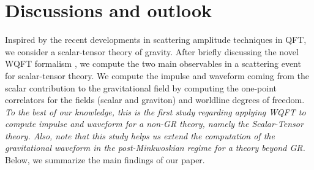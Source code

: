 \section{Discussions and outlook}\label{sec8}
Inspired by the recent developments in scattering amplitude techniques in QFT, we consider a scalar-tensor theory of gravity. After briefly discussing the novel WQFT formalism \cite{Mogull:2020sak}, we compute the two main observables in a scattering event for scalar-tensor theory. We compute the impulse and waveform coming from the scalar contribution to the gravitational field by computing the one-point correlators for the fields (scalar and graviton) and worldline degrees of freedom. \textit{To the best of our knowledge, this is the first study regarding applying WQFT to compute impulse and waveform for a non-GR theory, namely the Scalar-Tensor theory. Also, note that this study helps us extend the computation of the gravitational waveform in the post-Minkwoskian regime for a theory beyond GR.} Below, we summarize the main findings of our paper.

